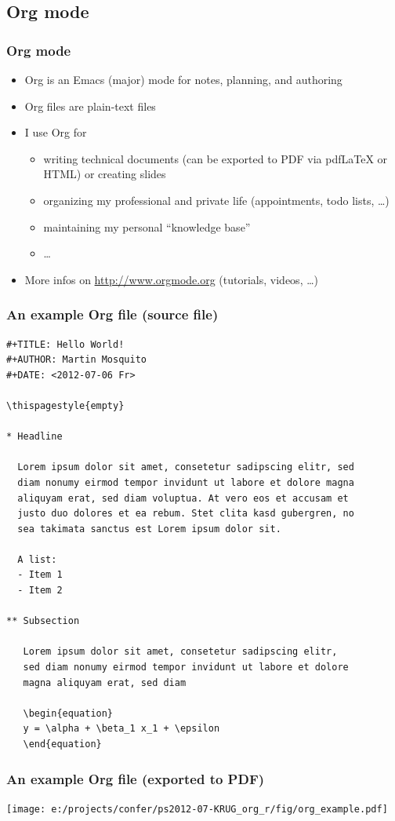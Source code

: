 \documentclass[bigger]{beamer}
\begin{document}
\subsection{Org mode}
\label{sec-2-3}
\begin{frame}
\frametitle{Org mode}
\label{sec-2-3-1}

\begin{itemize}
\item Org is an Emacs (major) mode for notes, planning, and authoring
\item Org files are plain-text files
\item I use Org for
\begin{itemize}
\item writing technical documents (can be exported to PDF via pdfLaTeX or HTML) or
    creating slides
\item organizing my professional and private life (appointments, todo lists, \ldots{})
\item maintaining my personal \enquote{knowledge base}
\item \ldots{}
\end{itemize}
\item More infos on \href{http://www.orgmode.org}{http://www.orgmode.org} (tutorials, videos, \ldots{})
\end{itemize}
\end{frame}
\begin{frame}[fragile,shrink = 25]
\frametitle{An example Org file (source file)}
\label{sec-2-3-2}



\lstset{language=org}
\begin{lstlisting}
#+TITLE: Hello World!
#+AUTHOR: Martin Mosquito
#+DATE: <2012-07-06 Fr>

\thispagestyle{empty}

* Headline

  Lorem ipsum dolor sit amet, consetetur sadipscing elitr, sed 
  diam nonumy eirmod tempor invidunt ut labore et dolore magna 
  aliquyam erat, sed diam voluptua. At vero eos et accusam et 
  justo duo dolores et ea rebum. Stet clita kasd gubergren, no 
  sea takimata sanctus est Lorem ipsum dolor sit. 

  A list:
  - Item 1
  - Item 2  

** Subsection 

   Lorem ipsum dolor sit amet, consetetur sadipscing elitr, 
   sed diam nonumy eirmod tempor invidunt ut labore et dolore 
   magna aliquyam erat, sed diam
   
   \begin{equation}
   y = \alpha + \beta_1 x_1 + \epsilon
   \end{equation}
\end{lstlisting}
\end{frame}
\begin{frame}
\frametitle{An example Org file (exported to PDF)}
\label{sec-2-3-3}


\texttt{[image: e:/projects/confer/ps2012-07-KRUG\_org\_r/fig/org\_example.pdf]}
\end{frame}
\end{document}
